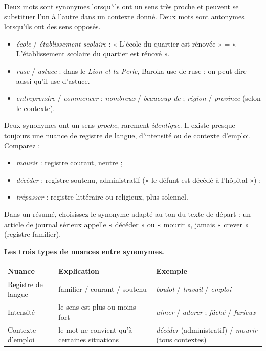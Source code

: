 \documentclass[11pt]{article}
\newcommand{\cle}[1]{{\popxbold\color{popdark}#1}}
\begin{document}
\begin{definition}
Deux mots sont \cle{synonymes} lorsqu'ils ont un sens très proche et peuvent se substituer l'un à l'autre dans un contexte donné. Deux mots sont \cle{antonymes} lorsqu'ils ont des sens opposés.
\end{definition}

\begin{exemplebox}
\begin{itemize}
\item \emph{école} / \emph{établissement scolaire} : « L'école du quartier est rénovée » = « L'établissement scolaire du quartier est rénové ».
\item \emph{ruse} / \emph{astuce} : dans le \emph{Lion et la Perle}, Baroka use de ruse ; on peut dire aussi qu'il use d'astuce.
\item \emph{entreprendre} / \emph{commencer} ; \emph{nombreux} / \emph{beaucoup de} ; \emph{région} / \emph{province} (selon le contexte).
\end{itemize}
\end{exemplebox}

\begin{attention}
Deux synonymes ont un sens \emph{proche}, rarement \emph{identique}. Il existe presque toujours une nuance de registre de langue, d'intensité ou de contexte d'emploi. Comparez :
\begin{itemize}
\item \emph{mourir} : registre courant, neutre ;
\item \emph{décéder} : registre soutenu, administratif (« le défunt est décédé à l'hôpital ») ;
\item \emph{trépasser} : registre littéraire ou religieux, plus solennel.
\end{itemize}
Dans un résumé, choisissez le synonyme adapté au ton du texte de départ : un article de journal sérieux appelle « décéder » ou « mourir », jamais « crever » (registre familier).
\end{attention}

\textbf{Les trois types de nuances entre synonymes.}

\begin{center}
\begin{tabularx}{\linewidth}{|l|X|X|}
\hline
\rowcolor{popblueL} \textbf{Nuance} & \textbf{Explication} & \textbf{Exemple} \\
\hline
Registre de langue & familier / courant / soutenu & \emph{boulot} / \emph{travail} / \emph{emploi} \\
\hline
Intensité & le sens est plus ou moins fort & \emph{aimer} / \emph{adorer} ; \emph{fâché} / \emph{furieux} \\
\hline
Contexte d'emploi & le mot ne convient qu'à certaines situations & \emph{décéder} (administratif) / \emph{mourir} (tous contextes) \\
\hline
\end{tabularx}
\end{center}
\end{document}
